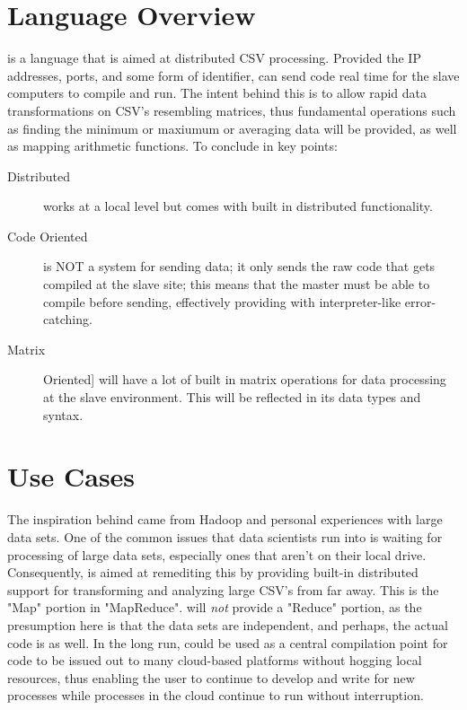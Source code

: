 \documentclass[10pt]{article}
\title{\name}
\author{PLT Group}
\begin{document}
\maketitle

\section{Language Overview}
    \name is a language that is aimed at distributed CSV processing. Provided the IP addresses, ports, and some form of identifier, \name can send code real time for the slave computers to compile and run. The intent behind this is to allow rapid data transformations on CSV's resembling matrices, thus fundamental operations such as finding the minimum or maxiumum or averaging data will be provided, as well as mapping arithmetic functions. To conclude in key points:
    \begin{description}
    \item[Distributed] \name works at a local level but comes with built in distributed functionality.
    \item[Code Oriented] \name is NOT a system for sending data; it only sends the raw code that gets compiled at the slave site; this means that the master must be able to compile before sending, effectively providing \name with interpreter-like error-catching.
    \item[Matrix] Oriented] \name will have a lot of built in matrix operations for data processing at the slave environment. This will be reflected in its data types and syntax.
    \end{description}
    
\section{Use Cases}
	The inspiration behind \name came from Hadoop and personal experiences with large data sets. One of the common issues that data scientists run into is waiting for processing of large data sets, especially ones that aren't on their local drive. Consequently, \name is aimed at remediting this by providing built-in distributed support for transforming and analyzing large CSV's from far away. This is the "Map" portion in "MapReduce". \name will \emph{not} provide a "Reduce" portion, as the presumption here is that the data sets are independent, and perhaps, the actual code is as well.
    In the long run, \name could be used as a central compilation point for code to be issued out to many cloud-based platforms without hogging local resources, thus enabling the user to continue to develop and write for new processes while processes in the cloud continue to run without interruption.
    
\end{document}
